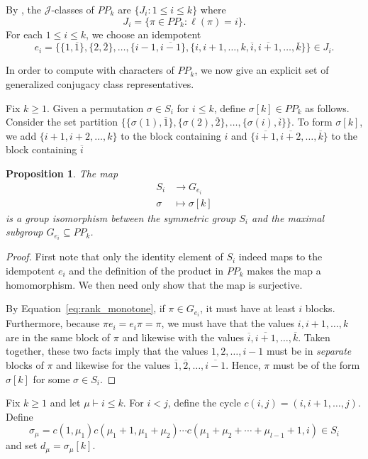 \documentclass{amsart}
\newtheorem{prop}[lemma]{Proposition}
\theoremstyle{definition}
\newcommand{\PP}{P\!P}
\newcommand{\ov}[1]{\overline{#1}}
\begin{document}
By \cite[Theorem 2.2]{FL98}, the $\mathcal{J}$-classes of $\PP_k$ are $\{J_i:1\leq i\leq k\}$ where \[J_i=\{\pi\in \PP_k:\ell(\pi)=i\}.\]
For each $1\leq i\leq k$, we choose an idempotent \[e_i=\{\{1,\ov1\},\{2,\ov2\},\ldots,\{i-1,\ov{i-1}\},\{i,i+1,\ldots,k,\ov{i},\ov{i+1},\ldots,\ov{k}\}\}\in J_i.\]

In order to compute with characters of $\PP_k$, we now give an explicit set of generalized conjugacy class representatives.

Fix $k\geq 1$.
Given a permutation $\sigma\in S_i$ for $i\leq k$, define $\sigma[k]\in\PP_k$ as follows.
Consider the set partition $\{\{\sigma(1),\ov1\},\{\sigma(2),\ov2\},\ldots,\{\sigma(i),\ov{i}\}\}$.
To form $\sigma[k]$, we add $\{i+1,i+2,\ldots,k\}$ to the block containing $i$ and $\{\ov{i+1},\ov{i+2},\ldots,\ov{k}\}$ to the block containing $\ov{i}$

\begin{prop}\label{prop:maximal_subgps_of_PP}
	The map \begin{align*}
		S_i&\to G_{e_i}\\
		\sigma&\mapsto \sigma[k]
	\end{align*} is a group isomorphism between the symmetric group $S_i$ and the maximal subgroup $G_{e_i}\subseteq\PP_k$.
\end{prop}

\begin{proof}
	First note that only the identity element of $S_i$ indeed maps to the idempotent $e_i$ and the
	definition of the product in $\PP_k$ makes the map a homomorphism. We then need only show that
	the map is surjective.

	By Equation~\ref{eq:rank_monotone}, if $\pi\in G_{e_i}$, it must have at least $i$ blocks.
	Furthermore, because $\pi e_i=e_i\pi=\pi$, we must have that the values $i,i+1,\ldots,k$ are in
	the same block of $\pi$ and likewise with the values $\ov{i},\ov{i+1},\ldots,\ov{k}$.
	Taken together, these two facts imply that the values $1,2,\ldots,i-1$ must be in \emph{separate}
	blocks of $\pi$ and likewise for the values $\ov{1},\ov{2},\ldots,\ov{i-1}$.
	Hence, $\pi$ must be of the form $\sigma[k]$ for some $\sigma\in S_i$.
\end{proof}

Fix $k\geq1$ and let $\mu\vdash i\leq k$.
For $i<j$, define the cycle $c(i,j)=(i,i+1,\ldots,j)$.
Define \[\sigma_\mu=c(1,\mu_1)c(\mu_1+1,\mu_1+\mu_2)\cdots c(\mu_1+\mu_2+\cdots+\mu_{l-1}+1,i)\in S_i\] and set $d_\mu=\sigma_\mu[k]$.
\end{document}
